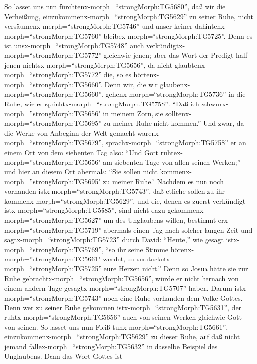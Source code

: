  So lasset uns nun fürchtenx-morph=``strongMorph:TG5680'',
daß wir die Verheißung, einzukommenx-morph=``strongMorph:TG5629'' zu
seiner Ruhe, nicht versäumenx-morph=``strongMorph:TG5746'' und unser
keiner dahintenx-morph=``strongMorph:TG5760''
bleibex-morph=``strongMorph:TG5725''.  Denn es ist
unsx-morph=``strongMorph:TG5748'' auch
verkündigtx-morph=``strongMorph:TG5772'' gleichwie jenen; aber das Wort
der Predigt half jenen nichtsx-morph=``strongMorph:TG5656'', da nicht
glaubtenx-morph=``strongMorph:TG5772'' die, so es
hörtenx-morph=``strongMorph:TG5660''.  Denn wir, die wir
glaubenx-morph=``strongMorph:TG5660'',
gehenx-morph=``strongMorph:TG5736'' in die Ruhe, wie er
sprichtx-morph=``strongMorph:TG5758'': ``Daß ich
schwurx-morph=''strongMorph:TG5656" in meinem Zorn, sie
solltenx-morph=``strongMorph:TG5695'' zu meiner Ruhe nicht kommen.'' Und
zwar, da die Werke von Anbeginn der Welt gemacht
warenx-morph=``strongMorph:TG5679'', 
sprachx-morph=``strongMorph:TG5758'' er an einem Ort von dem siebenten
Tag also: ``Und Gott ruhtex-morph=''strongMorph:TG5656" am siebenten
Tage von allen seinen Werken;''  und hier an diesem Ort
abermals: ``Sie sollen nicht kommenx-morph=''strongMorph:TG5695" zu
meiner Ruhe.''  Nachdem es nun noch vorhanden
istx-morph=``strongMorph:TG5743'', daß etliche sollen zu ihr
kommenx-morph=``strongMorph:TG5629'', und die, denen es zuerst
verkündigt istx-morph=``strongMorph:TG5685'', sind nicht dazu
gekommenx-morph=``strongMorph:TG5627'' um des Unglaubens willen,
 bestimmt erx-morph=``strongMorph:TG5719'' abermals einen
Tag nach solcher langen Zeit und sagtx-morph=``strongMorph:TG5723''
durch David: ``Heute,'' wie gesagt istx-morph=``strongMorph:TG5769'',
``so ihr seine Stimme hörenx-morph=''strongMorph:TG5661" werdet, so
verstocketx-morph=``strongMorph:TG5725'' eure Herzen nicht.''
 Denn so Josua hätte sie zur Ruhe
gebrachtx-morph=``strongMorph:TG5656'', würde er nicht hernach von einem
andern Tage gesagtx-morph=``strongMorph:TG5707'' haben. 
Darum istx-morph=``strongMorph:TG5743'' noch eine Ruhe vorhanden dem
Volke Gottes.  Denn wer zu seiner Ruhe gekommen
istx-morph=``strongMorph:TG5631'', der
ruhtx-morph=``strongMorph:TG5656'' auch von seinen Werken gleichwie Gott
von seinen.  So lasset uns nun Fleiß
tunx-morph=``strongMorph:TG5661'',
einzukommenx-morph=``strongMorph:TG5629'' zu dieser Ruhe, auf daß nicht
jemand fallex-morph=``strongMorph:TG5632'' in dasselbe Beispiel des
Unglaubens.  Denn das Wort Gottes ist
